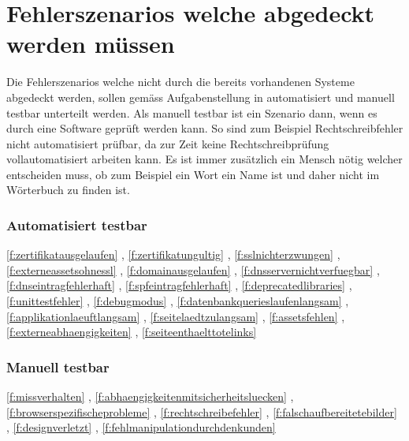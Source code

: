 \section{Fehlerszenarios welche abgedeckt werden müssen}
\label{sec:fehlerszenarios_welche_abgedeckt_werden_müssen}
Die Fehlerszenarios welche nicht durch die bereits vorhandenen Systeme abgedeckt werden, sollen gemäss Aufgabenstellung in automatisiert und manuell testbar unterteilt werden. Als manuell testbar ist ein Szenario dann, wenn es durch eine Software geprüft werden kann. So sind zum Beispiel Rechtschreibfehler nicht automatisiert prüfbar, da zur Zeit keine Rechtschreibprüfung vollautomatisiert arbeiten kann. Es ist immer zusätzlich ein Mensch nötig welcher entscheiden muss, ob zum Beispiel ein Wort ein Name ist und daher nicht im Wörterbuch zu finden ist.

\subsubsection{Automatisiert testbar}
\label{ssub:automatisiert_testbar}

\ref{f:zertifikatausgelaufen} \fzertifikatausgelaufen, \ref{f:zertifikatungultig} \fzertifikatungultig, \ref{f:sslnichterzwungen} \fsslnichterzwungen, \ref{f:externeassetsohnessl} \fexterneassetsohnessl, \ref{f:domainausgelaufen} \fdomainausgelaufen, \ref{f:dnsservernichtverfuegbar} \fdnsservernichtverfuegbar, \ref{f:dnseintragfehlerhaft} \fdnseintragfehlerhaft, \ref{f:spfeintragfehlerhaft} \fspfeintragfehlerhaft, \ref{f:deprecatedlibraries} \fdeprecatedlibraries, \ref{f:unittestfehler} \funittestfehler, \ref{f:debugmodus} \fdebugmodus, \ref{f:datenbankquerieslaufenlangsam} \fdatenbankquerieslaufenlangsam, \ref{f:applikationlaeuftlangsam} \fapplikationlaeuftlangsam, \ref{f:seitelaedtzulangsam} \fseitelaedtzulangsam, \ref{f:assetsfehlen} \fassetsfehlen, \ref{f:externeabhaengigkeiten} \fassetsfehlen, \ref{f:seiteenthaelttotelinks} \fseiteenthaelttotelinks

\subsubsection{Manuell testbar}
\label{ssub:manuel_testbar}

\ref{f:missverhalten} \fmissverhalten, \ref{f:abhaengigkeitenmitsicherheitsluecken} \fabhaengigkeitenmitsicherheitsluecken, \ref{f:browserspezifischeprobleme} \fbrowserspezifischeprobleme, \ref{f:rechtschreibefehler} \frechtschreibefehler, \ref{f:falschaufbereitetebilder} \ffalschaufbereitetebilder, \ref{f:designverletzt} \fdesignverletzt, \ref{f:fehlmanipulationdurchdenkunden} \ffehlmanipulationdurchdenkunden
